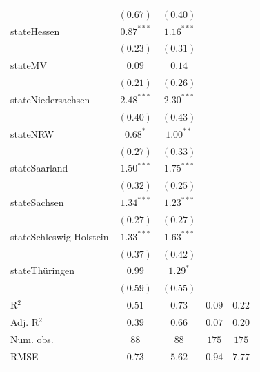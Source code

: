 \documentclass[12pt, a4paper, titlepage]{article}\usepackage[]{graphicx}\usepackage[]{color}
\begin{document}
\begin{table}
\begin{center}
{\begin{tabular}{l c c c c}
                          & $(0.67)$      & $(0.40)$     &              &            \\
stateHessen               & $0.87^{***}$  & $1.16^{***}$ &              &            \\
                          & $(0.23)$      & $(0.31)$     &              &            \\
stateMV                   & $0.09$        & $0.14$       &              &            \\
                          & $(0.21)$      & $(0.26)$     &              &            \\
stateNiedersachsen        & $2.48^{***}$  & $2.30^{***}$ &              &            \\
                          & $(0.40)$      & $(0.43)$     &              &            \\
stateNRW                  & $0.68^{*}$    & $1.00^{**}$  &              &            \\
                          & $(0.27)$      & $(0.33)$     &              &            \\
stateSaarland             & $1.50^{***}$  & $1.75^{***}$ &              &            \\
                          & $(0.32)$      & $(0.25)$     &              &            \\
stateSachsen              & $1.34^{***}$  & $1.23^{***}$ &              &            \\
                          & $(0.27)$      & $(0.27)$     &              &            \\
stateSchleswig-Holstein   & $1.33^{***}$  & $1.63^{***}$ &              &            \\
                          & $(0.37)$      & $(0.42)$     &              &            \\
stateThüringen            & $0.99$        & $1.29^{*}$   &              &            \\
                          & $(0.59)$      & $(0.55)$     &              &            \\
\hline
R$^2$                     & $0.51$        & $0.73$       & $0.09$       & $0.22$     \\
Adj. R$^2$                & $0.39$        & $0.66$       & $0.07$       & $0.20$     \\
Num. obs.                 & $88$          & $88$         & $175$        & $175$      \\
RMSE                      & $0.73$        & $5.62$       & $0.94$       & $7.77$     \\

\end{tabular}}
\end{center}
\end{table}
\end{document}
